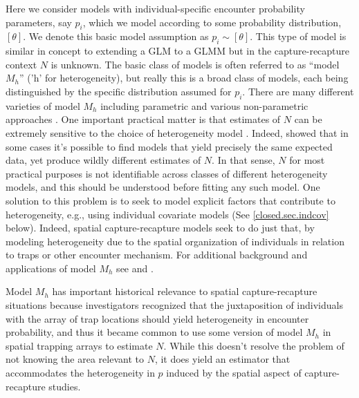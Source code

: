 Here we consider models with individual-specific encounter probability
parameters, say $p_{i}$, which we model according to some probability
distribution, $[\theta]$. We denote this basic model assumption as
$p_{i} \sim [\theta]$. This type of model is similar in concept to
extending a GLM to a GLMM but in the capture-recapture context $N$ is
unknown.  The basic class of models is often referred to as ``model
$M_h$'' ('h' for heterogeneity), but really this is a broad class of models, each being
distinguished by the specific distribution assumed for $p_{i}$.  There
are many different varieties of model $M_{h}$ including parametric and
various 
non-parametric approaches
\citep{burnham_overton:1978, norris_pollock:1996, pledger:2000}. One
important practical matter is that estimates of $N$ can be extremely
sensitive to the choice of heterogeneity model
\citep{fienberg_etal:1999, dorazio_royle:2003, link:2003}. Indeed,
\citet{link:2003} showed that in some cases it's possible to find
models that yield precisely the same expected data, yet produce wildly
different estimates of $N$. In that sense, $N$ for most practical
purposes is not identifiable across classes of different heterogeneity
models, and
this should be understood before fitting any such model. One solution
to this problem is to seek to model explicit factors that contribute
to heterogeneity, e.g., using individual covariate models (See
\ref{closed.sec.indcov} below). Indeed, spatial capture-recapture
models seek to do just that, by modeling heterogeneity due to the
spatial organization of individuals in relation to traps or other
encounter mechanism.  For additional background and applications of
model $M_{h}$ see \citet[][Chapt. 6]{royle_dorazio:2008} and
\citet[][Chapt. 6]{kery_schaub:2011}.

Model $M_{h}$ has important historical relevance to spatial
capture-recapture situations \citep{karanth:1995} because
investigators recognized that the juxtaposition of individuals with
the array of trap locations should yield heterogeneity in encounter
probability, and thus it became common to use some version of model $M_h$
in spatial trapping arrays to estimate $N$.  While this doesn't
resolve the problem of not knowing the area relevant to $N$, it does
yield an estimator that accommodates the heterogeneity in $p$ induced
by the spatial aspect of capture-recapture studies.

